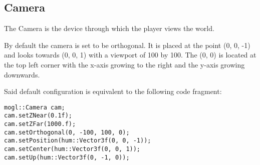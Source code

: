 \subsection{Camera}

The Camera is the device through which the player views the world.

By default the camera is set to be orthogonal. It is placed at the point (0, 0, -1)
and looks towards (0, 0, 1) with a viewport of 100 by 100. The (0, 0) is located at
the top left corner with the x-axis growing to the right and the y-axis growing
downwards.

Said default configuration is equivalent to the following code fragment:
\begin{lstlisting}[caption=Camera default settings]
mogl::Camera cam;
cam.setZNear(0.1f);
cam.setZFar(1000.f);
cam.setOrthogonal(0, -100, 100, 0);
cam.setPosition(hum::Vector3f(0, 0, -1));
cam.setCenter(hum::Vector3f(0, 0, 1));
cam.setUp(hum::Vector3f(0, -1, 0));
\end{lstlisting}
